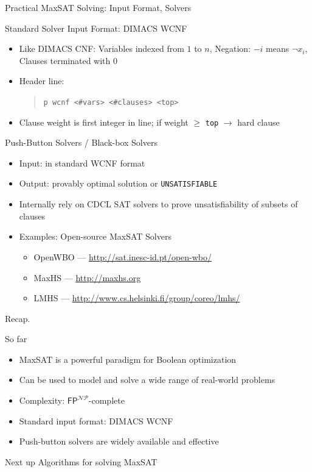 \documentclass[t,english]{sdqbeamer}
\begin{document}
\begin{frame}{Practical MaxSAT Solving: Input Format, Solvers}
\vspace{-2em}
\begin{block}{Standard Solver Input Format: DIMACS WCNF}
\begin{itemize}\itemsep1ex
	\item Like DIMACS CNF: Variables indexed from $1$ to $n$, Negation: $-i$ means $\lnot x_i$, Clauses terminated with $0$
	\item Header line:
	\begin{quote}
	\texttt{p wcnf <\#vars> <\#clauses> <top>}
	\end{quote}
	\item Clause weight is first integer in line; if weight $\geq$ \texttt{top} $\rightarrow$ hard clause
\end{itemize}
\end{block}
\begin{block}{Push-Button Solvers / Black-box Solvers}
\begin{itemize}\itemsep1ex
	\item Input: in standard WCNF format
	\item Output: provably optimal solution or \texttt{UNSATISFIABLE}
	\item Internally rely on CDCL SAT solvers to prove unsatisfiability of subsets of clauses
	\item Examples: Open-source MaxSAT Solvers
	\begin{itemize}
		\item OpenWBO --- \url{http://sat.inesc-id.pt/open-wbo/}
		\item MaxHS --- \url{http://maxhs.org}
		\item LMHS --- \url{http://www.cs.helsinki.fi/group/coreo/lmhs/}
	\end{itemize}
\end{itemize}
\end{block}
\end{frame}

\begin{frame}{Recap.}
\begin{block}{So far}
	\begin{itemize}\itemsep1em
		\item MaxSAT is a powerful paradigm for Boolean optimization
		\item Can be used to model and solve a wide range of real-world problems
		\item Complexity: $\mathsf{FP}^{\mathcal{NP}}$-complete
		\item Standard input format: DIMACS WCNF
		\item Push-button solvers are widely available and effective
	\end{itemize}
\end{block}
\begin{block}{Next up}
	Algorithms for solving MaxSAT
\end{block}
\end{frame}
\end{document}

